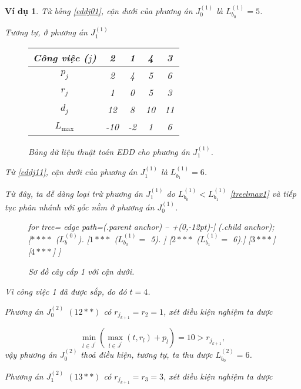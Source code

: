 \documentclass[12pt,a4paper]{report}
\newtheorem{vd}{Ví dụ}
\begin{document}
\begin{vd}
Từ bảng \eqref{eddj01}, cận dưới của phương án $J_0^{(1)}$ là $L_{b_0}^{(1)} = 5$.

Tương tự, ở phương án $J_1^{(1)}$

\begin{figure}[h!]
	\centering
	\begin{tabular}{|c | c c c c |} 
	\hline
	Công việc ($j$) & 2 & 1 & 4 & 3 \\
	\hline\hline
	$p_j$ & 2 & 4 & 5 & 6 \\
	$r_j$ & 1 & 0 & 5 & 3 \\
	$d_j$ & 12 & 8 & 10 & 11 \\
	$L_{\max}$ & -10 & -2 & 1 & 6 \\ 
	\hline
	\end{tabular}
\caption{\label{eddj11} Bảng dữ liệu thuật toán EDD cho phương án $J_1^{(1)}$.}
\end{figure}

Từ \eqref{eddj11}, cận dưới của phương án $J_1^{(1)}$ là $L_{b_1}^{(1)} = 6$.

Từ đây, ta dễ dàng loại trừ phương án $J_1^{(1)}$ do $L_{b_0}^{(1)} < L_{b_1}^{(1)}$ \eqref{treelmax1} và tiếp tục phân nhánh với gốc nằm ở phương án $J_0^{(1)}$.

\begin{figure}[h!]
	\centering
	\begin{forest} for tree={
		edge path={\noexpand{} (.parent anchor) -- +(0,-12pt)-| (.child anchor);}
	}
	[{$****$ ($L_b^{(0)}$).}
		[{$1***$ ($L_{b_0}^{(1)} =$ 5).}
		]
		[{$2***$ ($L_{b_1}^{(1)} =$ 6).}]
		[$3***$]
		[$4***$]
	]
	\end{forest}
\caption{\label{treelmax1} Sơ đồ cây cấp 1 với cận dưới.}
\end{figure}


Vì công việc 1 đã được sắp, do đó $t=4$.

Phương án $J_0^{(2)}$ $(12**)$ có $r_{j_{k+1}} = r_2 = 1$, xét điều kiện nghiệm ta được

\begin{equation*}
\underset{l \in J^{'}}{\min} (\underset{l \in J^{'}}{\max} (t, r_l) + p_l) = 10 > r_{j_{k+1}},
\end{equation*}
vậy phương án $J_0^{(2)}$ thoả điều kiện, tương tự, ta thu được $L_{b_0}^{(2)} = 6$.

Phương án $J_1^{(2)}$ $(13**)$ có $r_{j_{k+1}} = r_3 = 3$, xét điều kiện nghiệm ta được


\end{vd}
\end{document}
